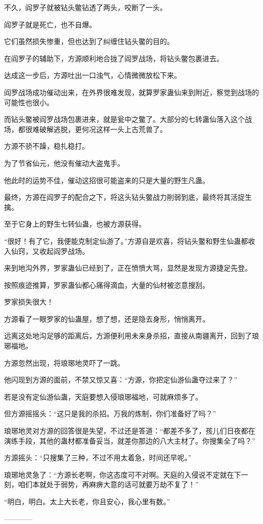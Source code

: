 \begin{this_body}
不久，阎罗子就被钻头鳖钻透了两头，咬断了一头。

阎罗子就是死亡，也不自爆。

它们虽然损失惨重，但也达到了纠缠住钻头鳖的目的。

在阎罗子的辅助下，方源顺利地合拢了阎罗战场，将钻头鳖包裹进去。

达成这一步后，方源吐出一口浊气，心情微微放松下来。

阎罗战场成功催动出来，在外界很难发现，就算罗家蛊仙来到附近，察觉到战场的可能性也很小。

而钻头鳖被阎罗战场包裹进来，就是瓮中之鳖了。大部分的七转蛊仙落入这个战场，都很难破解逃脱，更何况这样一头上古荒兽了。

方源不骄不躁，稳扎稳打。

为了节省仙元，他没有催动大盗鬼手。

他此时的运势不佳，催动这招很可能盗来的只是大量的野生凡蛊。

最终，方源在阎罗子的配合之下，将这头钻头鳖战力削弱到底，最终将其活捉生擒。

至于它身上的野生七转仙蛊，也被方源获得。

“很好！有了它，我便能克制定仙游了。”方源自是欢喜，将钻头鳖和野生仙蛊都收入仙窍，又收起阎罗战场。

来到地沟外界，罗家蛊仙已经到了，正在愤愤大骂，显然是发现方源捷足先登。

按照痕迹推算，罗家蛊仙都心痛得滴血，大量的仙材被恣意搜刮。

罗家损失很大！

方源看了一眼罗家的仙蛊屋，想了想，还是隐去身形，悄悄离开。

远离这处地沟足够的距离后，方源便利用未来身杀招，直接从南疆离开，回到了琅琊福地。

方源忽然出现，将琅琊地灵吓了一跳。

他闪现到方源的面前，不禁又惊又喜：“方源，你把定仙游仙蛊夺过来了？”

若是没有定仙游仙蛊，天庭要想入侵琅琊福地，可就麻烦多了。

但方源摇摇头：“这只是我的杀招。万我的炼制，你们准备好了吗？”

琅琊地灵对方源的回答很是失望，不过还是答道：“都差不多了，孩儿们日夜都在演练手段，其他的蛊材都准备妥当，就差你那边的八大主材了。你搜集全了吗？”

方源摇头：“只搜集了三种，不过不用太着急，时间还早呢。”

琅琊地灵急了：“方源长老啊，你这态度可不对啊。天庭的入侵说不定就在下一刻，咱们本就处于弱势，再麻痹大意的话可就要万劫不复了！”

“明白，明白。太上大长老，你且安心，我心里有数。”

------------

\end{this_body}

